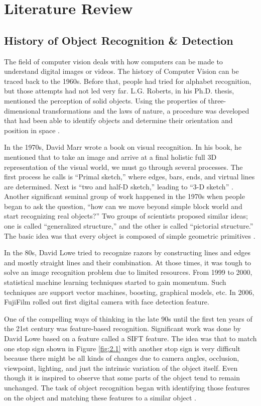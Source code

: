 \chapter{Literature Review}
\label{Chapter 2}

\section{History of Object Recognition \& Detection}

The field of computer vision deals with how computers can be made to understand digital images or videos. 
The history of Computer Vision can be traced back to the 1960s. Before that, people had tried for alphabet recognition, but those attempts had not led very far. L.G. Roberts, in his Ph.D. thesis, mentioned the perception of solid objects. Using the properties of three-dimensional transformations and the laws of nature, a procedure was developed that had been able to identify objects and determine their orientation and position in space \cite{chap_2_article:1}. 

In the 1970s, David Marr wrote a book on visual recognition. In his book, he mentioned that to take an image and arrive at a final holistic full 3D representation of the visual world, we must go through several processes. The first process he calls is “Primal sketch,” where edges, bars, ends, and virtual lines are determined. Next is “two and half-D sketch,” leading to “3-D sketch”  \cite{chap_2_article:2}. Another significant seminal 
group of work happened in the 1970s when people began to ask the question, “how can we move beyond simple block 
world and start recognizing real objects?” Two groups of scientists proposed similar ideas; one is called “generalized structure,” and the other is called “pictorial structure.” The basic idea was that every object is composed of simple geometric primitives \cite{chap_2_article:3}. 

In the 80s, David Lowe tried to recognize razors by constructing lines and edges and mostly straight lines and their combination. At those times, it was tough to solve an image recognition problem due to limited resources. From 1999 to 2000, statistical machine learning techniques started to gain momentum. Such techniques are support vector machines, boosting, graphical models, etc. In 2006, FujiFilm rolled out first 
digital camera with face detection feature.

One of the compelling ways of thinking in the late 90s until the first ten years of the 21st century was feature-based recognition. Significant work was done by David Lowe based on a feature called a SIFT feature. The idea was that to match one stop sign shown in Figure \ref{fig:2.1} with another stop sign is very difficult because there might be all kinds of changes due to camera angles, occlusion, viewpoint, lighting, and just the intrinsic variation of the object itself. Even though it is inspired to observe that some parts of the object tend to remain unchanged. The task of object recognition began with identifying those features on the object and matching these features to a similar object \cite{chap_2_article:4}.

